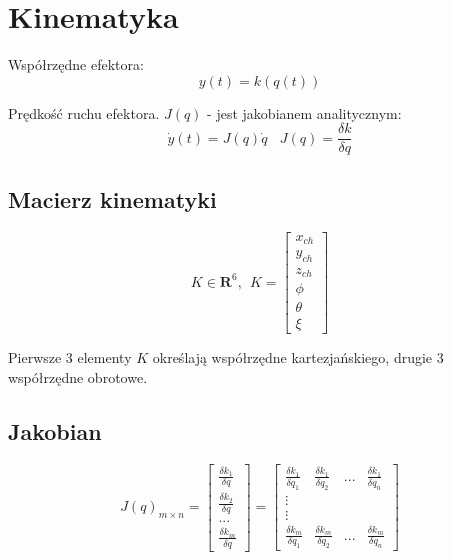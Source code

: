 \documentclass{article}
\begin{document}
\section{Kinematyka}

Współrzędne efektora:
$$
    y(t) = k( q(t) )
$$

Prędkość ruchu efektora. $J(q)$ - jest jakobianem analitycznym:
$$
    \dot{y}(t) = J(q) \dot{q}
    \ \ \ \
    J(q) = \frac{\delta k}{\delta q}
$$

\subsection{Macierz kinematyki}
\Large
$$
    K \in \textbf{R}^6, \ \
    K = \begin{bmatrix}
        x_{ch} \\
        y_{ch} \\
        z_{ch} \\
        \phi   \\
        \theta \\
        \xi
    \end{bmatrix}
$$
\normalsize

Pierwsze 3 elementy $K$ określają współrzędne kartezjańskiego, drugie 3 współrzędne obrotowe.

\subsection{Jakobian}
\Large
$$
    J(q)_{m\times n} = \begin{bmatrix}
        \frac{\delta k_1}{\delta q} \\
        \frac{\delta k_2}{\delta q} \\
        ...                         \\
        \frac{\delta k_m}{\delta q}
    \end{bmatrix}
    = \begin{bmatrix}
        \frac{\delta k_1}{\delta q_1} &
        \frac{\delta k_1}{\delta q_2} &
        ...                           &
        \frac{\delta k_1}{\delta q_n}   \\
        \vdots                          \\
        \vdots                          \\
        \frac{\delta k_m}{\delta q_1} &
        \frac{\delta k_m}{\delta q_2} &
        ...                           &
        \frac{\delta k_m}{\delta q_n}
    \end{bmatrix}
$$
\normalsize
\end{document}
